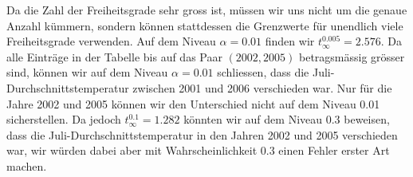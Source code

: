 Da die Zahl der Freiheitsgrade sehr gross ist, müssen wir
uns nicht um die genaue Anzahl kümmern, sondern können stattdessen
die Grenzwerte für unendlich viele Freiheitsgrade verwenden.
Auf
dem Niveau $\alpha=0.01$ finden wir $t_{\infty}^{0.005}=2.576$.
Da alle Einträge in der Tabelle bis auf das Paar $(2002,2005)$
betragsmässig grösser sind, können wir auf dem Niveau $\alpha=0.01$
schliessen, dass die Juli-Durchschnittstemperatur zwischen
2001 und 2006 verschieden war.
Nur für die Jahre 2002 und 2005
können wir den Unterschied nicht auf dem Niveau 0.01 sicherstellen.
Da jedoch $t_{\infty}^{0.1}=1.282$ könnten wir auf dem Niveau
$0.3$ beweisen, dass die Juli-Durchschnittstemperatur in den
Jahren 2002 und 2005 verschieden war, wir würden dabei aber 
mit Wahrscheinlichkeit $0.3$ einen Fehler erster Art machen.

